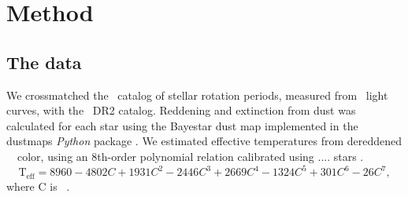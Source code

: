 \section{Method}

\subsection{The data}

We crossmatched the \mct\ catalog of stellar rotation periods, measured from
\kepler\ light curves, with the \gaia\ DR2 catalog.
Reddening and extinction from dust was calculated for each star using the
Bayestar dust map implemented in the dustmaps {\it Python} package
\citep{green2018}.
We estimated effective temperatures from dereddened \Gaia\ \gcolor\ color,
using an 8th-order polynomial relation calibrated using .... stars
.
\begin{equation}
    \mathrm{T_{eff}} = 8960 -4802C + 1931C^2 -2446C^3 + 2669C^4 - 1324C^5 +
    301C^6 - 26C^7,
\end{equation}
where C is \gaia\ \gcolor.

